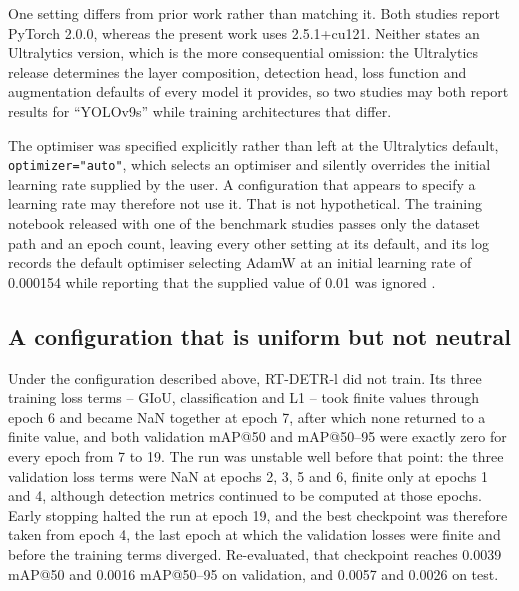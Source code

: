One setting differs from prior work rather than matching it. Both studies report
PyTorch 2.0.0, whereas the present work uses 2.5.1+cu121. Neither states an
Ultralytics version, which is the more consequential omission: the Ultralytics
release \citep{ultralytics} determines the layer composition, detection head,
loss function and augmentation defaults of every model it provides, so two
studies may both report results for ``YOLOv9s'' while training architectures
that differ.

The optimiser was specified explicitly rather than left at the Ultralytics
default, \texttt{optimizer=\allowbreak"auto"}, which selects an optimiser and
silently overrides the initial learning rate supplied by the user. A
configuration that appears to specify a learning rate may therefore not use it.
That is not hypothetical. The training notebook released with one of the
benchmark studies passes only the dataset path and an epoch count, leaving every
other setting at its default, and its log records the default optimiser selecting
AdamW at an initial learning rate of 0.000154 while reporting that the supplied
value of 0.01 was ignored \citep{yolov12notebook}.

\subsection{A configuration that is uniform but not neutral}
\label{sec:rtdetr-lr}

Under the configuration described above, RT-DETR-l did not train. Its three
training loss terms -- GIoU, classification and L1 -- took finite values through
epoch 6 and became NaN together at epoch 7, after which none returned to a finite
value, and both validation mAP@50 and mAP@50--95 were exactly zero for every
epoch from 7 to 19. The
run was unstable well before that point: the three validation loss terms were NaN
at epochs 2, 3, 5 and 6, finite only at epochs 1 and 4, although detection metrics
continued to be computed at those epochs. Early stopping halted the run at epoch
19, and the best checkpoint was therefore taken from epoch 4, the last epoch at
which the validation losses were finite and before the training terms diverged.
Re-evaluated, that checkpoint reaches 0.0039 mAP@50 and 0.0016 mAP@50--95 on
validation, and 0.0057 and 0.0026 on test.

